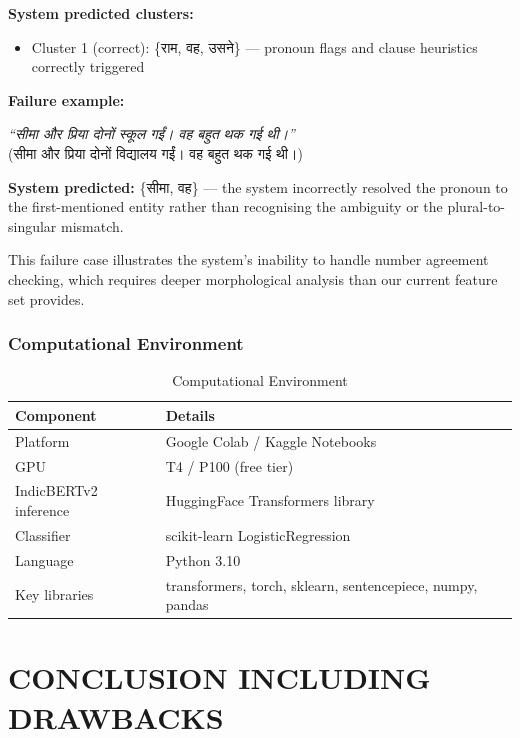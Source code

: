 \documentclass[12pt,a4paper]{report}
\begin{document}
\textbf{System predicted clusters:}
\begin{itemize}
    \item Cluster 1 (correct): \{{\hindifont राम, वह, उसने}\} --- pronoun flags and clause heuristics correctly triggered
\end{itemize}

\textbf{Failure example:}
\begin{center}
\textit{``{\hindifont सीमा और प्रिया दोनों स्कूल गईं। वह बहुत थक गई थी।}''}\\
({\hindifont सीमा और प्रिया दोनों विद्यालय गईं। वह बहुत थक गई थी।})
\end{center}

\textbf{System predicted:} \{{\hindifont सीमा, वह}\} --- the system incorrectly resolved the pronoun to the first-mentioned entity rather than recognising the ambiguity or the plural-to-singular mismatch.

\noindent This failure case illustrates the system's inability to handle number agreement checking, which requires deeper morphological analysis than our current feature set provides.

\subsection{Computational Environment}

\begin{table}[H]
\centering
\caption{Computational Environment}
\begin{tabular}{|l|l|}
\hline
\textbf{Component} & \textbf{Details} \\
\hline
Platform & Google Colab / Kaggle Notebooks \\
GPU & T4 / P100 (free tier) \\
IndicBERTv2 inference & HuggingFace Transformers library \\
Classifier & scikit-learn LogisticRegression \\
Language & Python 3.10 \\
Key libraries & transformers, torch, sklearn, sentencepiece, numpy, pandas \\
\hline
\end{tabular}
\end{table}


\chapter{CONCLUSION INCLUDING DRAWBACKS}
\end{document}
